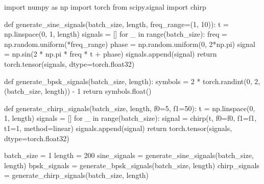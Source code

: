 \documentclass[
  letterpaper,
  DIV=11,
  numbers=noendperiod]{scrartcl}
\newenvironment{Shaded}{\begin{snugshade}}{\end{snugshade}}
\newcommand{\BuiltInTok}[1]{\textcolor[rgb]{0.40,0.85,0.94}{#1}}
\newcommand{\ControlFlowTok}[1]{\textcolor[rgb]{0.98,0.15,0.45}{#1}}
\newcommand{\DecValTok}[1]{\textcolor[rgb]{0.68,0.51,1.00}{#1}}
\newcommand{\ImportTok}[1]{\textcolor[rgb]{0.98,0.15,0.45}{#1}}
\newcommand{\KeywordTok}[1]{\textcolor[rgb]{0.98,0.15,0.45}{#1}}
\newcommand{\NormalTok}[1]{\textcolor[rgb]{0.97,0.97,0.95}{#1}}
\newcommand{\OperatorTok}[1]{\textcolor[rgb]{0.97,0.97,0.95}{#1}}
\newcommand{\StringTok}[1]{\textcolor[rgb]{0.90,0.86,0.45}{#1}}
\begin{document}
\begin{Shaded}
\begin{Highlighting}[]
\ImportTok{import}\NormalTok{ numpy }\ImportTok{as}\NormalTok{ np}
\ImportTok{import}\NormalTok{ torch}
\ImportTok{from}\NormalTok{ scipy.signal }\ImportTok{import}\NormalTok{ chirp}

\KeywordTok{def}\NormalTok{ generate\_sine\_signals(batch\_size, length, freq\_range}\OperatorTok{=}\NormalTok{(}\DecValTok{1}\NormalTok{, }\DecValTok{10}\NormalTok{)):}
\NormalTok{    t }\OperatorTok{=}\NormalTok{ np.linspace(}\DecValTok{0}\NormalTok{, }\DecValTok{1}\NormalTok{, length)}
\NormalTok{    signals }\OperatorTok{=}\NormalTok{ []}
    \ControlFlowTok{for}\NormalTok{ \_ }\KeywordTok{in} \BuiltInTok{range}\NormalTok{(batch\_size):}
\NormalTok{        freq }\OperatorTok{=}\NormalTok{ np.random.uniform(}\OperatorTok{*}\NormalTok{freq\_range)}
\NormalTok{        phase }\OperatorTok{=}\NormalTok{ np.random.uniform(}\DecValTok{0}\NormalTok{, }\DecValTok{2}\OperatorTok{*}\NormalTok{np.pi)}
\NormalTok{        signal }\OperatorTok{=}\NormalTok{ np.sin(}\DecValTok{2} \OperatorTok{*}\NormalTok{ np.pi }\OperatorTok{*}\NormalTok{ freq }\OperatorTok{*}\NormalTok{ t }\OperatorTok{+}\NormalTok{ phase)}
\NormalTok{        signals.append(signal)}
    \ControlFlowTok{return}\NormalTok{ torch.tensor(signals, dtype}\OperatorTok{=}\NormalTok{torch.float32)}

\KeywordTok{def}\NormalTok{ generate\_bpsk\_signals(batch\_size, length):}
\NormalTok{    symbols }\OperatorTok{=} \DecValTok{2} \OperatorTok{*}\NormalTok{ torch.randint(}\DecValTok{0}\NormalTok{, }\DecValTok{2}\NormalTok{, (batch\_size, length)) }\OperatorTok{{-}} \DecValTok{1}
    \ControlFlowTok{return}\NormalTok{ symbols.}\BuiltInTok{float}\NormalTok{()}

\KeywordTok{def}\NormalTok{ generate\_chirp\_signals(batch\_size, length, f0}\OperatorTok{=}\DecValTok{5}\NormalTok{, f1}\OperatorTok{=}\DecValTok{50}\NormalTok{):}
\NormalTok{    t }\OperatorTok{=}\NormalTok{ np.linspace(}\DecValTok{0}\NormalTok{, }\DecValTok{1}\NormalTok{, length)}
\NormalTok{    signals }\OperatorTok{=}\NormalTok{ []}
    \ControlFlowTok{for}\NormalTok{ \_ }\KeywordTok{in} \BuiltInTok{range}\NormalTok{(batch\_size):}
\NormalTok{        signal }\OperatorTok{=}\NormalTok{ chirp(t, f0}\OperatorTok{=}\NormalTok{f0, f1}\OperatorTok{=}\NormalTok{f1, t1}\OperatorTok{=}\DecValTok{1}\NormalTok{, method}\OperatorTok{=}\StringTok{\textquotesingle{}linear\textquotesingle{}}\NormalTok{)}
\NormalTok{        signals.append(signal)}
    \ControlFlowTok{return}\NormalTok{ torch.tensor(signals, dtype}\OperatorTok{=}\NormalTok{torch.float32)}

\NormalTok{batch\_size }\OperatorTok{=} \DecValTok{1}
\NormalTok{length }\OperatorTok{=} \DecValTok{200}
\NormalTok{sine\_signals }\OperatorTok{=}\NormalTok{ generate\_sine\_signals(batch\_size, length)}
\NormalTok{bpsk\_signals }\OperatorTok{=}\NormalTok{ generate\_bpsk\_signals(batch\_size, length)}
\NormalTok{chirp\_signals }\OperatorTok{=}\NormalTok{ generate\_chirp\_signals(batch\_size, length)}
\end{Highlighting}
\end{Shaded}
\end{document}
